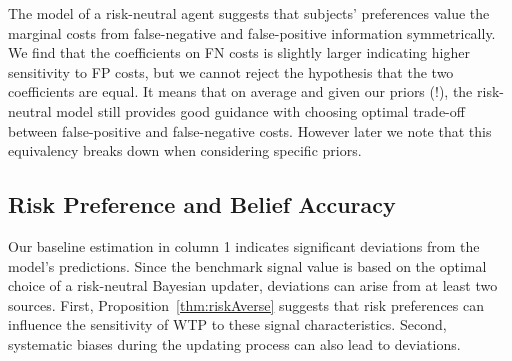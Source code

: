 \documentclass[12pt,a4paper]{article}
\begin{document}
		


The model of a risk-neutral agent suggests that subjects' preferences value the marginal costs from false-negative and false-positive information symmetrically. 
We find that the coefficients on FN costs is slightly larger indicating higher sensitivity to FP costs, but we cannot reject the hypothesis that the two coefficients are equal. It means that on average and given our priors (!), the risk-neutral model still provides good guidance with choosing optimal trade-off between false-positive and false-negative costs. However later we note that this equivalency breaks down when considering specific priors. 

\subsection{Risk Preference and Belief Accuracy}

Our baseline estimation in column 1 indicates significant deviations from the model's predictions. Since the benchmark signal value is based on the optimal choice of a risk-neutral Bayesian updater, deviations can arise from at least two sources. First, Proposition~\ref{thm:riskAverse} suggests that risk preferences can influence the sensitivity of WTP to these signal characteristics. Second, systematic biases during the updating process can also lead to deviations. 
\end{document}
